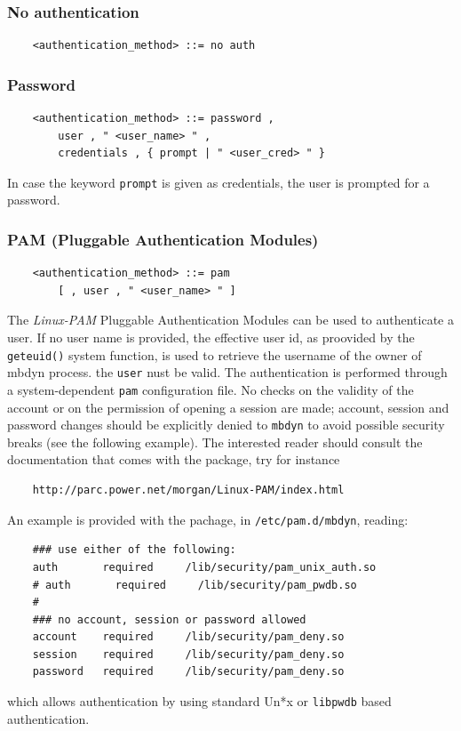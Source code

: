 \documentclass[10pt,dvips]{report}
\begin{document}
\subsubsection{No authentication}
\begin{verbatim}
    <authentication_method> ::= no auth
\end{verbatim}

\subsubsection{Password}
\begin{verbatim}
    <authentication_method> ::= password ,
        user , " <user_name> " ,
        credentials , { prompt | " <user_cred> " }
\end{verbatim}
In case the keyword {\tt prompt} is given as credentials, the user is
prompted for a password.

\subsubsection{PAM (Pluggable Authentication Modules)}
\begin{verbatim}
    <authentication_method> ::= pam 
        [ , user , " <user_name> " ]
\end{verbatim}
The {\em Linux-PAM} Pluggable Authentication Modules can be used to
authenticate a user. 
If no user name is provided, the effective user id, as proovided by the 
{\tt geteuid()} system function, is used to retrieve the username of the
owner of mbdyn process.
the {\tt user} nust be valid. 
The authentication is performed through a system-dependent {\tt pam}
configuration file.
No checks on the validity of the account or on the permission of opening a
session are made; account, session and password changes should be explicitly
denied to {\tt mbdyn} to avoid possible security breaks (see the following
example).
The interested reader should consult the documentation that comes with the
package, try for instance
\begin{verbatim}
    http://parc.power.net/morgan/Linux-PAM/index.html
\end{verbatim}
An example is provided with the pachage, in  {\tt /etc/pam.d/mbdyn}, reading:
\begin{verbatim}
    ### use either of the following:
    auth       required     /lib/security/pam_unix_auth.so
    # auth       required     /lib/security/pam_pwdb.so
    #
    ### no account, session or password allowed
    account    required     /lib/security/pam_deny.so
    session    required     /lib/security/pam_deny.so
    password   required     /lib/security/pam_deny.so
\end{verbatim}
which allows authentication by using standard Un*x or {\tt libpwdb} based
authentication.
\end{document}
